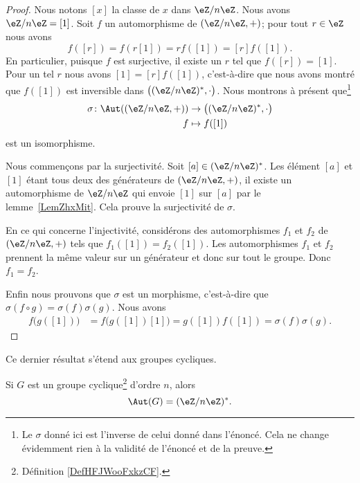 \begin{proof}
	Nous notons \( [x]\) la classe de \( x\) dans \( \eZ/n\eZ\). Nous avons \( \eZ/n\eZ=[1]\). Soit \( f\) un automorphisme de \( (\eZ/n\eZ,+)\); pour tout \( r\in \eZ\) nous avons
	\begin{equation}
		f([r])=f(r[1])=rf([1])=[r]f([1]).
	\end{equation}
	En particulier, puisque \( f\) est surjective, il existe un \( r\) tel que \( f([r])=[1]\). Pour un tel \( r\) nous avons \( [1]=[r]f([1])\), c'est-à-dire que nous avons montré que \( f([1])\) est inversible dans \(  \big( (\eZ/n\eZ)^*,\cdot\big)\). Nous montrons à présent que\footnote{Le \( \sigma\) donné ici est l'inverse de celui donné dans l'énoncé. Cela ne change évidemment rien à la validité de l'énoncé et de la preuve.}
	\begin{equation}
		\begin{aligned}
			\sigma\colon \Aut( (\eZ/n\eZ,+)) & \to \big( (\eZ/n\eZ)^*,\cdot \big) \\
			f                                & \mapsto f([1])
		\end{aligned}
	\end{equation}
	est un isomorphisme.

	Nous commençons par la surjectivité. Soit \( [a]\in (\eZ/n\eZ)^*\). Les élément \( [a]\) et \( [1]\) étant tous deux des générateurs de \( (\eZ/n\eZ,+)\), il existe un automorphisme de \( \eZ/n\eZ\) qui envoie \( [1]\) sur \( [a]\) par le lemme~\ref{LemZhxMit}. Cela prouve la surjectivité de \( \sigma\).

	En ce qui concerne l'injectivité, considérons des automorphismes \( f_1\) et \( f_2\) de \( (\eZ/n\eZ,+)\) tels que \( f_1([1])=f_2([1])\). Les automorphismes \( f_1\) et \( f_2\) prennent la même valeur sur un générateur et donc sur tout le groupe. Donc \( f_1=f_2\).

	Enfin nous prouvons que \( \sigma\) est un morphisme, c'est-à-dire que \( \sigma(f\circ g)=\sigma(f)\sigma(g)\). Nous avons
	\begin{subequations}
		\begin{align}
			f\big( g([1]) \big) & =f\big( g([1])[1] \big)=g([1])f([1])=\sigma(f)\sigma(g).
		\end{align}
	\end{subequations}
\end{proof}

Ce dernier résultat s'étend aux groupes cycliques.
\begin{proposition}     \label{PROPooBZOMooVOHoYf}
	Si \( G\) est un groupe cyclique\footnote{Définition \ref{DefHFJWooFxkzCF}.} d'ordre \( n\), alors
	\begin{equation}
		\Aut(G)=(\eZ/n\eZ)^*.
	\end{equation}
\end{proposition}


